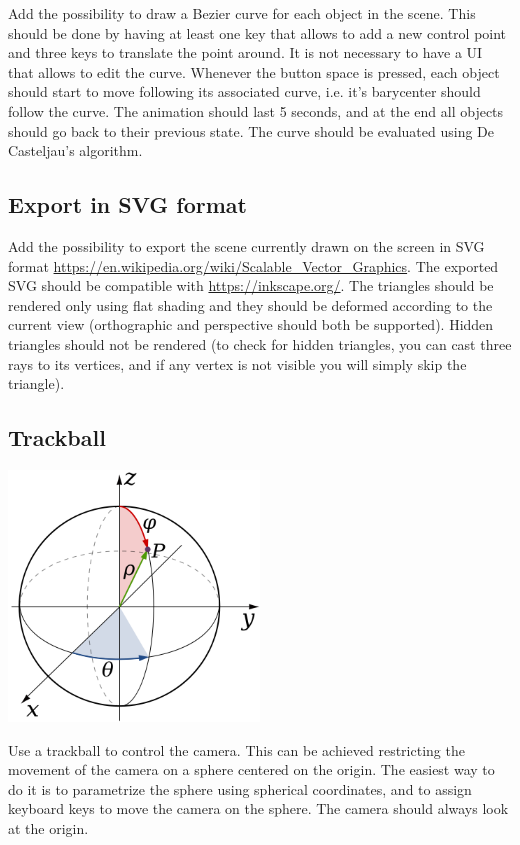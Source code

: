 \documentclass[11pt]{article}
\begin{document}
Add the possibility to draw a Bezier curve for each object in the scene. This should be done by having at least one key that allows to add a new control point and three keys to translate the point around. It is not necessary to have a UI that allows to edit the curve. Whenever the button space is pressed, each object should start to move following its associated curve, i.e. it's barycenter should follow the curve. The animation should last 5 seconds, and at the end all objects should go back to their previous state. The curve should be evaluated using De Casteljau's algorithm.

\subsection{Export in SVG format}

Add the possibility to export the scene currently drawn on the screen in SVG format \url{https://en.wikipedia.org/wiki/Scalable_Vector_Graphics}. The exported SVG should be compatible with \url{https://inkscape.org/}. The triangles should be rendered only using flat shading and they should be deformed according to the current view (orthographic and perspective should both be supported). Hidden triangles should not be rendered (to check for hidden triangles, you can cast three rays to its vertices, and if any vertex is not visible you will simply skip the triangle).

\subsection{Trackball}

  \begin{center}
    \includegraphics[width=0.5\textwidth]{trackball}
  \end{center}
Use a trackball to control the camera. This can be achieved restricting the movement of the camera on a sphere centered on the origin. The easiest way to do it is to parametrize the sphere using spherical coordinates, and to assign keyboard keys to move the camera on the sphere. The camera should always look at the origin.




%
%
\end{document}
